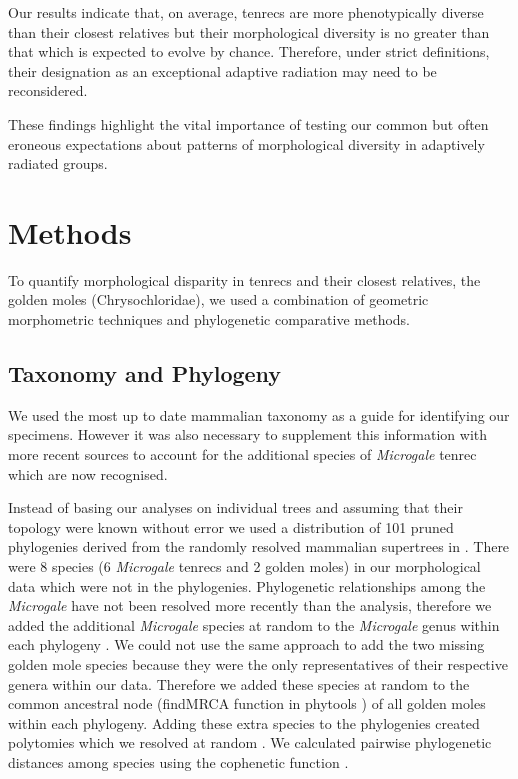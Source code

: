 \documentclass[12pt,a4paper]{article}
\begin{document}
Our results indicate that, on average, tenrecs are more phenotypically diverse than their closest relatives but their morphological diversity is no greater than that which is expected to evolve by chance. Therefore, under strict definitions, their designation as an exceptional adaptive radiation may need to be reconsidered. 

These findings highlight the vital importance of testing our common but often eroneous expectations about patterns of morphological diversity in adaptively radiated groups. 


\section{Methods}
To quantify morphological disparity in tenrecs and their closest relatives, the golden moles (Chrysochloridae), we used a combination of geometric morphometric techniques and phylogenetic comparative methods. 

\subsection{Taxonomy and Phylogeny}
We used the most up to date mammalian taxonomy \citep{Wilson2005} as a guide for identifying our specimens. However it was also necessary to supplement this information with more recent sources \citep{IUCN2012, Olson2013} to account for the additional species of \textit{Microgale} tenrec \citep{Olson2004, Goodman2006, Olson2009} which are now recognised. 


Instead of basing our analyses on individual trees and assuming that their topology were known without error 
\citep[e.g.][]{Ruta2013, Foth2012, Brusatte2008, Harmon2003} we used a distribution of 101 pruned phylogenies derived from the randomly resolved mammalian supertrees in \citep{Kuhn2011}. 
There were 8 species (6 \textit{Microgale} tenrecs and 2 golden moles) in our morphological data which were not in the phylogenies. Phylogenetic relationships among the \textit{Microgale} have not been resolved more recently than the \citep{Kuhn2011} analysis, therefore we added the additional \textit{Microgale} species at random to the \textit{Microgale} genus within each phylogeny \citep{Revell2012}. We could not use the same approach to add the two missing golden mole species because they were the only representatives of their respective genera within our data. Therefore we added these species at random to the common ancestral node (findMRCA function in phytools \citep{Revell2012}) of all golden moles within each phylogeny. Adding these extra species to the phylogenies created polytomies which we resolved at random \citep{Paradis2004}. We calculated pairwise phylogenetic distances among species using the cophenetic function \citep[R Development Core][]{Team2013}. 
\end{document}

